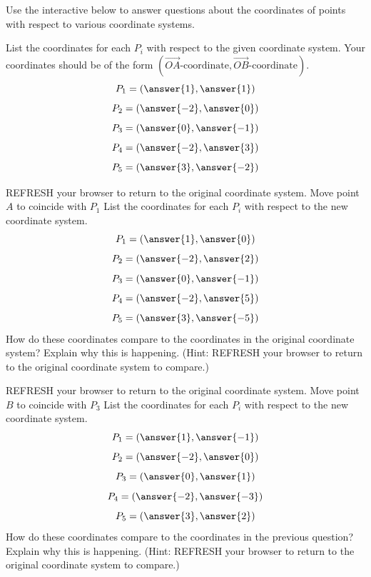 \documentclass{ximera}
\begin{document}
\begin{exploration}\label{exp:coordSystemLinCombs1}
Use the interactive below to answer questions about the coordinates of points with respect to various coordinate systems.
\begin{center}
\end{center}
\begin{question}
    List the coordinates for each $P_i$ with respect to the given coordinate system.  Your coordinates should be of the form $(\overrightarrow{OA}\text{-coordinate}, \overrightarrow{OB}\text{-coordinate})$.
    $$P_1=\left(\answer{1},\answer{1}\right)$$
    $$P_2=\left(\answer{-2},\answer{0}\right)$$
    $$P_3=\left(\answer{0},\answer{-1}\right)$$
    $$P_4=\left(\answer{-2},\answer{3}\right)$$
    $$P_5=\left(\answer{3},\answer{-2}\right)$$
\end{question}

\begin{question}
REFRESH your browser to return to the original coordinate system.  Move point $A$ to coincide with $P_1$
    List the coordinates for each $P_i$ with respect to the new coordinate system.  
    $$P_1=\left(\answer{1},\answer{0}\right)$$
    $$P_2=\left(\answer{-2},\answer{2}\right)$$
    $$P_3=\left(\answer{0},\answer{-1}\right)$$
    $$P_4=\left(\answer{-2},\answer{5}\right)$$
    $$P_5=\left(\answer{3},\answer{-5}\right)$$
    How do these coordinates compare to the coordinates in the original coordinate system?  Explain why this is happening. (Hint: REFRESH your browser to return to the original coordinate system to compare.)
\end{question}

\begin{question}
REFRESH your browser to return to the original coordinate system. Move point $B$ to coincide with $P_3$
    List the coordinates for each $P_i$ with respect to the new coordinate system.  
    $$P_1=\left(\answer{1},\answer{-1}\right)$$
    $$P_2=\left(\answer{-2},\answer{0}\right)$$
    $$P_3=\left(\answer{0},\answer{1}\right)$$
    $$P_4=\left(\answer{-2},\answer{-3}\right)$$
    $$P_5=\left(\answer{3},\answer{2}\right)$$
    How do these coordinates compare to the coordinates in the previous question?  Explain why this is happening. (Hint: REFRESH your browser to return to the original coordinate system to compare.)
\end{question}



\end{exploration}
\end{document}

